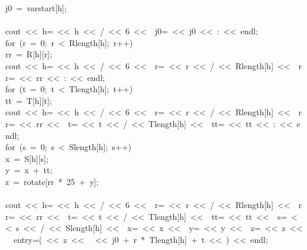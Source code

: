 \begin{tabbing}
\>\>j0\ =\ varstart[h];\\[0pt]
\\[0pt]
\>\>cout\ <<\ h=\ <<\ h\ <<\ /\ <<\ 6\ <<\ \ j0=\ <<\ j0\ <<\ :\ <<\ endl;\\[0pt]
\>\>for\ (r\ =\ 0;\ r\ <\ Rlength[h];\ r++)\ \\[0pt]
\>\>\>rr\ =\ R[h][r];\\[0pt]
\>\>\>cout\ <<\ h=\ <<\ h\ <<\ /\ <<\ 6\ <<\ \ r=\ <<\ r\ <<\ /\ <<\ Rlength[h]\ <<\ \ rr=\ <<\ rr\ <<\ :\ <<\ endl;\\[0pt]
\>\>\>for\ (t\ =\ 0;\ t\ <\ Tlength[h];\ t++)\ \\[0pt]
\>\>\>\>tt\ =\ T[h][t];\\[0pt]
\>\>\>\>cout\ <<\ h=\ <<\ h\ <<\ /\ <<\ 6\ <<\ \ r=\ <<\ r\ <<\ /\ <<\ Rlength[h]\ <<\ \ rr=\ <<\ rr\ <<\ \ t=\ <<\ t\ <<\ /\ <<\ Tlength[h]\ <<\ \ tt=\ <<\ tt\ <<\ :\ <<\ endl;\\[0pt]
\>\>\>\>for\ (s\ =\ 0;\ s\ <\ Slength[h];\ s++)\ \\[0pt]
\>\>\>\>\>x\ =\ S[h][s];\\[0pt]
\>\>\>\>\>y\ =\ x\ +\ tt;\\[0pt]
\>\>\>\>\>z\ =\ rotate[rr\ *\ 25\ +\ y];\\[0pt]
\>\>\>\>\>\\[0pt]
\>\>\>\>\>cout\ <<\ h=\ <<\ h\ <<\ /\ <<\ 6\ <<\ \ r=\ <<\ r\ <<\ /\ <<\ Rlength[h]\ <<\ \ rr=\ <<\ rr\ <<\ \ t=\ <<\ t\ <<\ /\ <<\ Tlength[h]\ <<\ \ tt=\ <<\ tt\ <<\ \ s=\ <<\ s\ <<\ /\ <<\ Slength[h]\ <<\ \ x=\ <<\ x\ <<\ \ y=\ <<\ y\ <<\ \ z=\ <<\ z\ <<\ \ entry=(\ <<\ z\ <<\ 
\ <<\ j0\ +\ r\ *\ Tlength[h]\ +\ t\ <<\ )\ <<\ endl;\\[0pt]

\end{tabbing}
